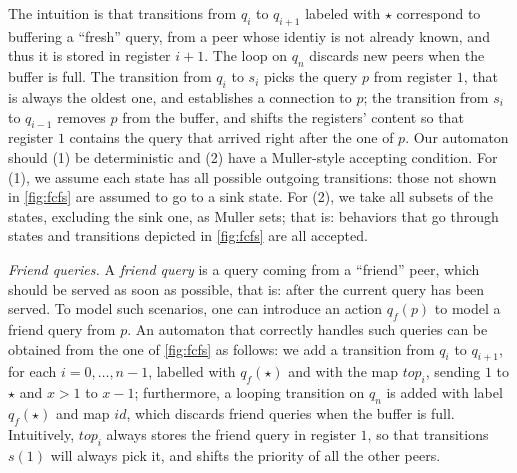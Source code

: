 %
The intuition is that transitions from $q_i$ to $q_{i+1}$ labeled with $\star$ correspond to buffering a ``fresh'' query, from a peer whose identiy is not already known, and thus it is stored in register $i+1$. The loop on $q_n$ discards new peers when the buffer is full. The transition from $q_i$ to $s_i$ picks the query $p$ from register $1$, that is always the oldest one, and establishes a connection to $p$; the transition from $s_i$ to $q_{i-1}$ removes $p$ from the buffer, and shifts the registers' content so that register $1$ contains the query that arrived right after the one of $p$. Our automaton should (1) be deterministic and (2) have a Muller-style accepting condition. For (1), we assume each state has all possible outgoing transitions: those not shown in \autoref{fig:fcfs} are assumed to go to a sink state. For (2), we take all subsets of the states, excluding the sink one, as Muller sets; that is: behaviors that go through states and transitions depicted in \autoref{fig:fcfs} are all accepted. 

\emph{Friend queries.} A \emph{friend query} is a query coming from a ``friend'' peer, which should be served as soon as possible, that is: after the current query has been served. To model such scenarios, one can introduce an action $q_f(p)$ to model a friend query from $p$. An automaton that correctly handles such queries can be obtained from the one of \autoref{fig:fcfs} as follows: we add a transition from $q_i$ to $q_{i+1}$, for each $i=0,\dots,n-1$, labelled with $q_f(\star)$ and with the map $top_i$, sending $1$ to $\star$ and $x > 1$ to $x-1$; furthermore, a looping transition on $q_n$ is added with label $q_f(\star)$ and map $id$, which discards friend queries when the buffer is full. Intuitively, $top_i$ always stores the friend query in register $1$, so that transitions $s(1)$ will always pick it, and shifts the priority of all the other peers.